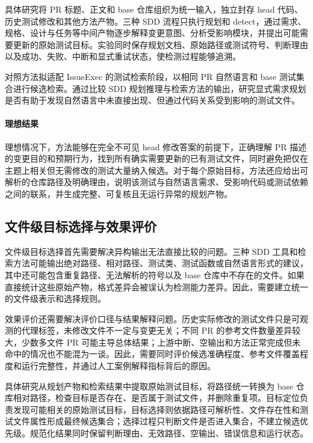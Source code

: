具体研究将 PR 标题、正文和 base 仓库组织为统一输入，独立封存 head 代码、历史测试修改和其他方法产物。三种 SDD 流程只执行规划和 detect，通过需求、规格、设计与任务等中间产物逐步解释变更意图、分析受影响模块，并提出可能需要更新的原始测试目标。实验同时保存规划文档、原始路径或测试符号、判断理由以及成功、失败、中断和显式重试状态，使检测过程能够追溯。

对照方法拟适配 IssueExec 的测试检索阶段，以相同 PR 自然语言和 base 测试集合进行候选检索。通过比较 SDD 规划推理与检索方法的输出，研究显式需求规划是否有助于发现自然语言中未直接出现、但通过代码关系受到影响的测试文件。

\paragraph{理想结果}

理想情况下，方法能够在完全不可见 head 修改答案的前提下，正确理解 PR 描述的变更目的和预期行为，找到所有确实需要更新的已有测试文件，同时避免把仅在主题上相关但无需修改的测试大量纳入候选。对于每个原始目标，方法还应给出可解析的仓库路径及明确理由，说明该测试与自然语言需求、受影响代码或测试依赖之间的联系，并生成完整、可复核且无运行异常的规划产物。

\subsection{文件级目标选择与效果评价}



文件级目标选择首先需要解决异构输出无法直接比较的问题。三种 SDD 工具和检索方法可能输出绝对路径、相对路径、测试类、测试函数或自然语言形式的建议，其中还可能包含重复路径、无法解析的符号以及 base 仓库中不存在的文件。如果直接统计这些原始产物，格式差异会被误认为检测能力差异。因此，需要建立统一的文件级表示和选择规则。

效果评价还需要解决评价口径与结果解释问题。历史实际修改的测试文件只是可观测的代理标签，未修改文件不一定与变更无关；不同 PR 的参考文件数量差异较大，少数多文件 PR 可能主导总体结果；上游中断、空输出和方法正常完成但未命中的情况也不能混为一谈。因此，需要同时评价候选准确程度、参考文件覆盖程度和运行完整性，并通过人工案例解释指标背后的原因。


具体研究从规划产物和检索结果中提取原始测试目标，将路径统一转换为 base 仓库相对路径，检查目标是否存在、是否属于测试文件，并删除重复项。目标定位负责发现可能相关的原始测试目标，目标选择则依据路径可解析性、文件存在性和测试文件属性形成最终候选集合；选择过程只判断文件是否进入集合，不建立候选优先级。规范化结果同时保留判断理由、无效路径、空输出、错误信息和运行状态。

